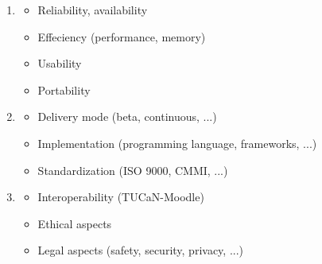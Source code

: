 \clearpage
\begin{defBox}[title=Non-functional requirements]
    \begin{enumerate}
        \item {}
        \begin{itemize}
            \item Reliability, availability
            \item Effeciency (performance, memory)
            \item Usability
            \item Portability
        \end{itemize}
        \item {}
        \begin{itemize}
            \item Delivery mode (beta, continuous, ...)
            \item Implementation (programming language, frameworks, ...)
            \item Standardization (ISO 9000, CMMI, ...)
        \end{itemize}
        \item {}
        \begin{itemize}
            \item Interoperability (TUCaN-Moodle)
            \item Ethical aspects
            \item Legal aspects (safety, security, privacy, ...)
        \end{itemize}
    \end{enumerate}
\end{defBox}
